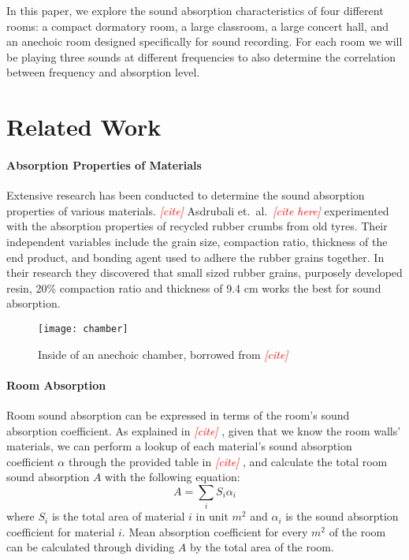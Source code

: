 \documentclass[12pt,onecolumn,letterpaper,draftclsnofoot]{article}
\newcommand{\todo}[1]{\textcolor{red}{{\em [#1]}} }
\begin{document}
In this paper, we explore the sound absorption characteristics of four 
different rooms: a compact dormatory room, a large classroom, a large concert
hall, and an anechoic room designed specifically for sound recording. For each
room we will be playing three sounds at different frequencies to also determine
the correlation between frequency and absorption level.

\section{Related Work}

\paragraph{Absorption Properties of Materials}
Extensive research has been conducted to determine the sound absorption
properties of various materials. \todo{cite} Asdrubali et.\ al.\ \todo{cite
here} experimented with the absorption properties of recycled rubber crumbs
from old tyres. Their independent variables include the grain size, compaction
ratio, thickness of the end product, and bonding agent used to adhere the
rubber grains together. In their research they discovered that small sized
rubber grains, purposely developed resin, 20\% compaction ratio and thickness
of 9.4 cm works the best for sound absorption.
%
\begin{figure}
  \centering
  \texttt{[image: chamber]}
  \caption{Inside of an anechoic chamber, borrowed from \todo{cite}}
  \label{fig:chamber}
\end{figure}

\paragraph{Room Absorption} 
Room sound absorption can be expressed in terms of the room's sound absorption
coefficient. As explained in \todo{cite}, given that we know the room walls'
materials, we can perform a lookup of each material's sound absorption
coefficient $\alpha$ through the provided table in \todo{cite}, and calculate
the total room sound absorption $A$ with the following equation:
%
\begin{equation}
  A = \sum_{i} S_i \alpha_i
\end{equation}
%
where $S_i$ is the total area of material $i$ in unit $m^2$ and $\alpha_i$ is
the sound absorption coefficient for material $i$. Mean absorption coefficient
for every $m^2$ of the room can be calculated through dividing $A$ by the
total area of the room.
\end{document}
